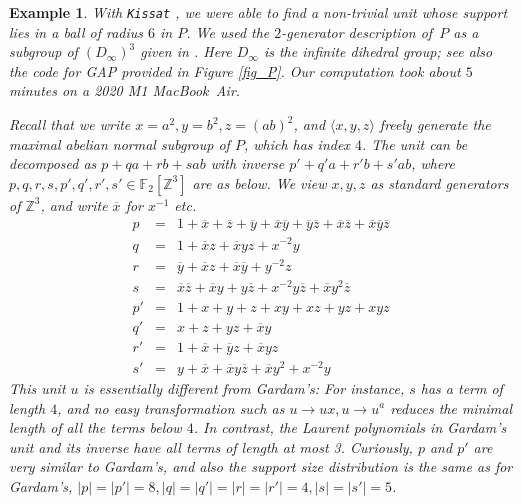 \documentclass[11pt]{amsart}
\newcommand\textcode[1]{{\footnotesize \rm\texttt{#1}}}
\theoremstyle{mythm}
\theoremstyle{mydef}
\newtheorem{example}[theorem]{Example}
\theoremstyle{myrem}
\numberwithin{equation}{section}
\newcommand{\la}{\langle}
\newcommand{\ra}{\rangle}
\newcommand{\ZZ}{{\mathbb{Z}}}
\newcommand{\ol}{\overline}
\begin{document}
\begin{example}\label{ex1}
  With \textcode{Kissat} \cite{kissat}, we were able to find a non-trivial unit whose support lies in a ball of radius $6$ in $P$. We used the $2$-generator description of~$P$ as a subgroup of $(D_\infty)^3$ given in \cite{P}. Here $D_\infty$ is the infinite dihedral group; see also the code for GAP \cite{gap} provided in Figure \ref{fig_P}. Our computation took about $5$ minutes on a 2020 M1 MacBook~Air.

  Recall that we write  $x= a^2, y= b^2, z= (ab)^2$, and  $\la x,y,z \ra$ freely generate the maximal  abelian normal subgroup of $P$, which  has index $4$.  The unit can be decomposed as  $p + qa + rb +sab$ with inverse $p' + q'a +  r'b +s'ab$, where $p,q,r,s, p',q',r',s' \in \mathbb F_2[\ZZ^3]$ are as below.  We view  $x,y,z$ as standard generators of $\ZZ^3$, and  write $\ol x$ for $x^{-1}$ etc.
\begin{eqnarray*}
p &=& 1 +\ol x + \ol z +   \ol y + \ol x\ol y + \ol y\ol z + \ol x\ol z +  \ol x\ol y\ol z   \\
q &=&  1 + \ol x z + \ol x y z + x^{-2} y \\
r &=& \ol y +  \ol x z + \ol x\ol y +  y^{-2} z \\
s &=&   \ol x\ol z + \ol x y + y\ol z + x^{-2} y\ol z + \ol x y^2\ol z\\[1ex] 
p' &=& 1 + x + y + z +  x y   + x z  + y z  + x y z  \\
q' &=&  x + z + y z + \ol x y \\
r' &=& 1 + \ol x   +  \ol y z + \ol x y z \\ 
s' &=&  y + \ol x + \ol x y\ol z + \ol x y^2  + x^{-2} y
\end{eqnarray*}
This unit  $u$ is essentially different from Gardam's: For instance, $s$ has a term of length $4$, and no easy transformation such as $u \to ux, u \to u^a$ reduces the minimal length of all the terms below $4$.  In contrast, the Laurent polynomials in Gardam's unit and its inverse have  all terms of length at most 3. Curiously, $p $ and $p'$ are very similar to Gardam's, and also the support size distribution is the same as for Gardam's, $|p|= |p'|=8, |q| = |q'|= |r| = |r'| = 4, |s|= |s'| = 5$.
\end{example}
\end{document}
